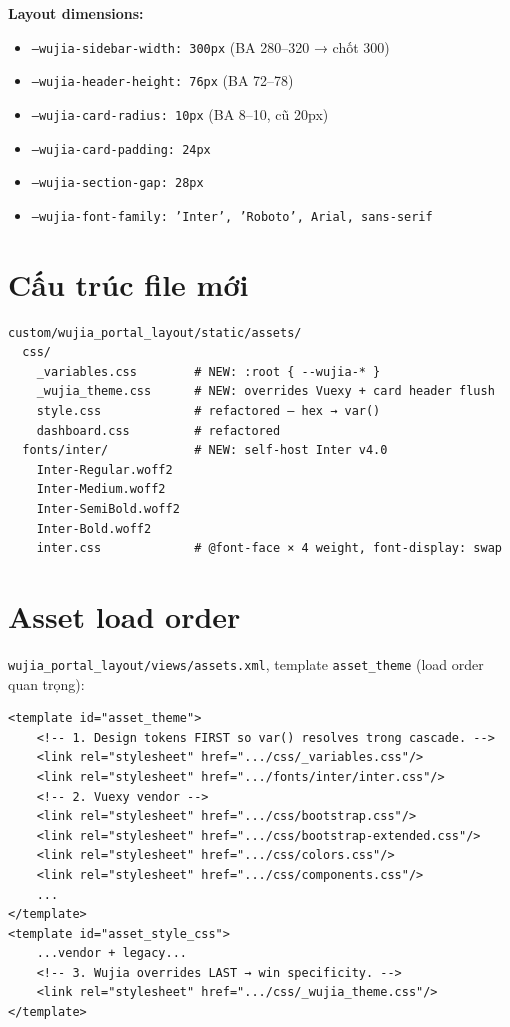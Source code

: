 \textbf{Layout dimensions:}
\begin{itemize}
\item \texttt{--wujia-sidebar-width: 300px} (BA 280--320 → chốt 300)
\item \texttt{--wujia-header-height: 76px} (BA 72--78)
\item \texttt{--wujia-card-radius: 10px} (BA 8--10, cũ 20px)
\item \texttt{--wujia-card-padding: 24px}
\item \texttt{--wujia-section-gap: 28px}
\item \texttt{--wujia-font-family: 'Inter', 'Roboto', Arial, sans-serif}
\end{itemize}

\section{Cấu trúc file mới}

\begin{lstlisting}[style=shell]
custom/wujia_portal_layout/static/assets/
  css/
    _variables.css        # NEW: :root { --wujia-* }
    _wujia_theme.css      # NEW: overrides Vuexy + card header flush
    style.css             # refactored — hex → var()
    dashboard.css         # refactored
  fonts/inter/            # NEW: self-host Inter v4.0
    Inter-Regular.woff2
    Inter-Medium.woff2
    Inter-SemiBold.woff2
    Inter-Bold.woff2
    inter.css             # @font-face × 4 weight, font-display: swap
\end{lstlisting}

\section{Asset load order}

\texttt{wujia\_portal\_layout/views/assets.xml}, template \texttt{asset\_theme} (load order quan trọng):

\begin{lstlisting}[style=xml]
<template id="asset_theme">
    <!-- 1. Design tokens FIRST so var() resolves trong cascade. -->
    <link rel="stylesheet" href=".../css/_variables.css"/>
    <link rel="stylesheet" href=".../fonts/inter/inter.css"/>
    <!-- 2. Vuexy vendor -->
    <link rel="stylesheet" href=".../css/bootstrap.css"/>
    <link rel="stylesheet" href=".../css/bootstrap-extended.css"/>
    <link rel="stylesheet" href=".../css/colors.css"/>
    <link rel="stylesheet" href=".../css/components.css"/>
    ...
</template>
<template id="asset_style_css">
    ...vendor + legacy...
    <!-- 3. Wujia overrides LAST → win specificity. -->
    <link rel="stylesheet" href=".../css/_wujia_theme.css"/>
</template>
\end{lstlisting}

